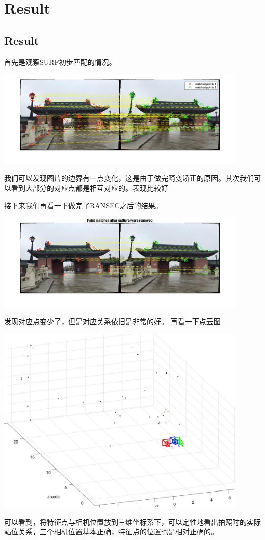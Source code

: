 \chapter{Result}
\label{chap:Result}

\section{Result}
首先是观察SURF初步匹配的情况。

\begin{center}
    \includegraphics[width=0.9\textwidth]{figures/1.jpg}
\end{center}

我们可以发现图片的边界有一点变化，这是由于做完畸变矫正的原因。其次我们可以看到大部分的对应点都是相互对应的。表现比较好

接下来我们再看一下做完了RANSEC之后的结果。
\begin{center}
    \includegraphics[width=0.9\textwidth]{figures/2.jpg}
\end{center}

发现对应点变少了，但是对应关系依旧是非常的好。
再看一下点云图
\begin{center}
    \includegraphics[width=0.9\textwidth]{figures/3.jpg}
\end{center}
可以看到，将特征点与相机位置放到三维坐标系下，可以定性地看出拍照时的实际站位关系，三个相机位置基本正确，特征点的位置也是相对正确的。

